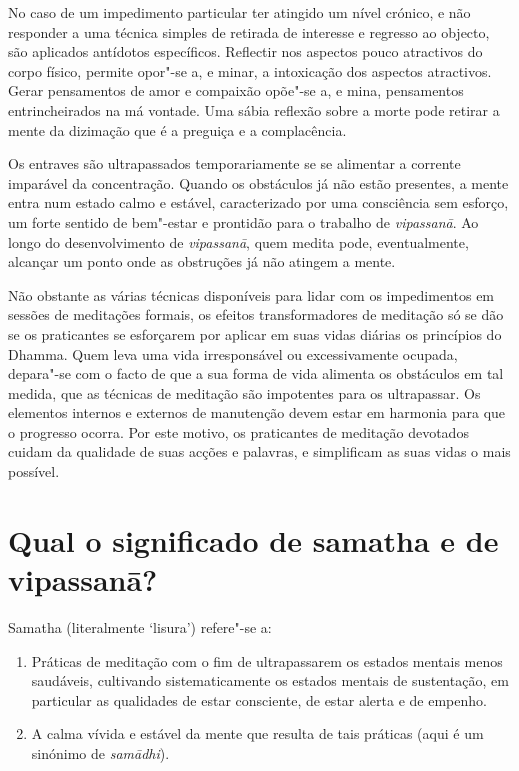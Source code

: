 No caso de um impedimento particular ter atingido um nível crónico, e
não responder a uma técnica simples de retirada de interesse e regresso
ao objecto, são aplicados antídotos específicos. Reflectir nos aspectos
pouco atractivos do corpo físico, permite opor"-se a, e minar, a
intoxicação dos aspectos atractivos. Gerar pensamentos de amor e
compaixão opõe"-se a, e mina, pensamentos entrincheirados na má vontade.
Uma sábia reflexão sobre a morte pode retirar a mente da dizimação que é
a preguiça e a complacência.

Os entraves são ultrapassados temporariamente se se alimentar a corrente
imparável da concentração. Quando os obstáculos já não estão presentes,
a mente entra num estado calmo e estável, caracterizado por uma
consciência sem esforço, um forte sentido de bem"-estar e prontidão para
o trabalho de \emph{vipassanā}. Ao longo do desenvolvimento de
\emph{vipassanā}, quem medita pode, eventualmente, alcançar um ponto
onde as obstruções já não atingem a mente.

Não obstante as várias técnicas disponíveis para lidar com os
impedimentos em sessões de meditações formais, os efeitos
transformadores de meditação só se dão se os praticantes se esforçarem
por aplicar em suas vidas diárias os princípios do Dhamma. Quem leva uma
vida irresponsável ou excessivamente ocupada, depara"-se com o facto de
que a sua forma de vida alimenta os obstáculos em tal medida, que as
técnicas de meditação são impotentes para os ultrapassar. Os elementos
internos e externos de manutenção devem estar em harmonia para que o
progresso ocorra. Por este motivo, os praticantes de meditação devotados
cuidam da qualidade de suas acções e palavras, e simplificam as suas
vidas o mais possível.

\section{Qual o significado de samatha e de vipassanā?}

Samatha (literalmente `lisura') refere"-se a:

\begin{enumerate}
\item
  Práticas de meditação com o fim de ultrapassarem os estados mentais
  menos saudáveis, cultivando sistematicamente os estados mentais de
  sustentação, em particular as qualidades de estar consciente, de estar
  alerta e de empenho.
\item
  A calma vívida e estável da mente que resulta de tais práticas (aqui é
  um sinónimo de \emph{samādhi}).
\end{enumerate}

